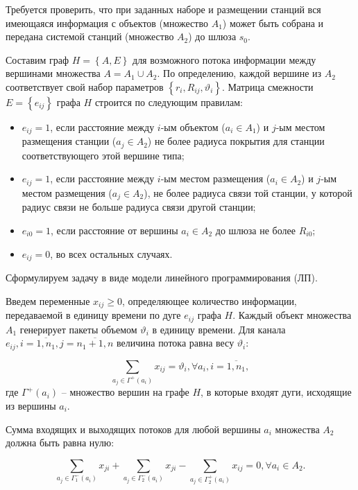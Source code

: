 Требуется проверить, что при заданных наборе и размещении станций вся имеющаяся информация с объектов (множество $A_1$) может быть собрана и передана системой станций (множество $A_2$) до шлюза $s_0$.


Составим граф $ H = \left\{A,E \right\} $ для возможного потока информации между вершинами множества $ A = A_1 \cup A_2 $. По определению, каждой вершине из $ A_2 $ соответствует свой набор параметров $\left\{ r_i,  R_{ij}, \vartheta_i \right\} $.
Матрица смежности $E = \left\{ e_{ij} \right\}$ графа $H$ строится по следующим правилам:

\begin{itemize}
    \item $e_{ij} = 1$, если расстояние между $i$-ым объектом ($a_i \in A_1$) и $j$-ым местом размещения станции ($a_j \in A_2$) не более радиуса покрытия для станции соответствующего этой вершине типа; 
    \item $e_{ij} = 1$, если расстояние между $i$-ым местом размещения ($a_i \in A_2$) и $j$-ым местом размещения  ($a_j \in A_2$), не более радиуса связи той станции, у которой радиус связи не больше радиуса связи другой станции;
    \item $e_{i0} = 1$, если расстояние от вершины $a_i \in A_2$ до шлюза не более $R_{i0}$;
    \item $e_{ij} = 0$, во всех остальных случаях.
\end{itemize}

Сформулируем задачу в виде модели линейного программирования (ЛП).

Введем переменные $x_{ij} \geqslant 0$, определяющее количество информации, передаваемой в единицу времени по дуге $e_{ij}$ графа $H$. Каждый объект множества $A_1$ генерирует пакеты объемом $\vartheta_i$ в единицу времени. Для канала $e_{ij}, i = \overline{1,n_1}, j = \overline{n_1+1,n}$ величина потока равна весу $\vartheta_i$:

\begin{equation}\label{eq:part2_1.1}
    \sum_{a_j \in \Gamma^+(a_i)} x_{ij} = \vartheta_i, \forall a_i, i=\overline{1, n_1},
\end{equation}
где $\Gamma^+(a_i)$ – множество вершин на графе $H$, в которые входят дуги, исходящие из вершины $a_i$. 

Сумма входящих и выходящих потоков для любой вершины $a_i$  множества $A_2$ должна быть равна нулю:

\begin{equation}\label{eq:part2_1.2}
    \sum_{a_j \in \Gamma_1^-(a_i)} x_{ji} + \sum_{a_j \in \Gamma_2^-(a_i)} x_{ji} -  \sum_{a_j \in \Gamma_2^+(a_i)} x_{ij} =0 ,\forall a_i \in A_2. 
\end{equation}

